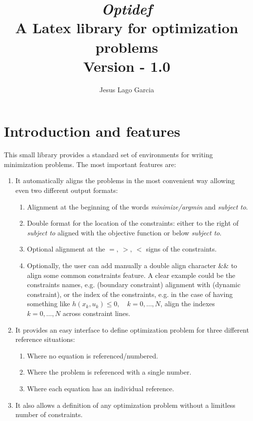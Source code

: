 \documentclass[]{report}
\title{\textit{\textbf{Optidef}} \\ A Latex library for optimization problems\\ \textnormal{Version - 1.0}}
\author{Jesus Lago Garcia}
\begin{document}
\maketitle

\section{Introduction and features}

This small library provides a standard set of environments for writing minimization problems. The most important features are:
\begin{enumerate}
	\item It automatically aligns the problems in the most convenient way allowing even two different output formats:
		\begin{enumerate}
			\item Alignment at the beginning of the words \textit{minimize/argmin} and \textit{subject to}.
			\item Double format for the location of the constraints: either to the right of  \textit{subject to} aligned with the objective function or below \textit{subject to}.
			\item Optional alignment at the $=,~>,~<$ signs of the constraints.
			\item Optionally, the user can add manually a double align character \&\& to align some common constraints feature. A clear example could be the constraints names, e.g. (boundary constraint) alignment with (dynamic constraint), or the index of the constraints, e.g. in the case of having something like $h(x_k,u_k)\leq 0,\quad k=0,\ldots,N$, align the indexes $k=0,\ldots,N$ across constraint lines.
		\end{enumerate}

\item It provides an easy interface to define optimization problem for three different reference situations:
\begin{enumerate}
	\item Where no equation is referenced/numbered.
	\item Where the problem is referenced with a single number.
	\item Where each equation has an individual reference.
\end{enumerate} 

\item It also allows a definition of any optimization problem without a limitless number of constraints.

\end{enumerate}
\end{document}
